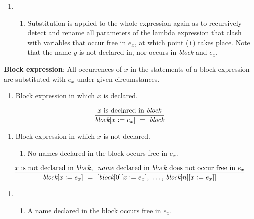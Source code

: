 \begin{enumerate}
    \item[]
    \begin{enumerate}[label=\roman*., start=2]
        \item[]
        \vspace{3mm}
        Substitution is applied to the whole expression again as to recursively detect and rename all parameters of the lambda expression that clash with variables that occur free in $e_x$, at which point (\,i\,) takes place. Note that the name $y$ is not declared in, nor occurs in \textit{block} and $e_x$.
    \end{enumerate}
\end{enumerate}

\pagebreak
\textbf{Block expression}: All occurrences of $x$ in the statements of a block expression are substituted with $e_x$ under given circumstances.
\begin{enumerate}[label=\large\protect\textcircled{\small\arabic*}]
    \item Block expression in which $x$ is declared.
\end{enumerate}
    \[
    \frac{
      x \text{ is declared in \textit{block}}
    }{
      \textit{block}[x := e_x]
      \ = \ 
      \textit{block}
    }
    \]
\vspace{3mm}
\begin{enumerate}[label=\large\protect\textcircled{\small\arabic*}, start=2]
    \item Block expression in which $x$ is not declared.
    \begin{enumerate}[label=(\,\roman*\,)]
        \item No names declared in the block occurs free in $e_x$.
    \end{enumerate}
\end{enumerate}
        \[
        \frac{
           x \text{ is not declared in \textit{block}}\text{, } \ \textit{name} \text{ declared in \textit{block} does not occur free in } e_x
        }{
          \textit{block}[x := e_x]
          \ = \ 
          [\textit{block}[0][x := e_x] \text{, } \ldots \text{, } \textit{block}[n][x := e_x]]
        }
        \]
\vspace{3mm}
\begin{enumerate}
    \item[]
    \begin{enumerate}[label=(\,\roman*\,), start=2]
        \item A name declared in the block occurs free in $e_x$.
    \end{enumerate}
\end{enumerate}
